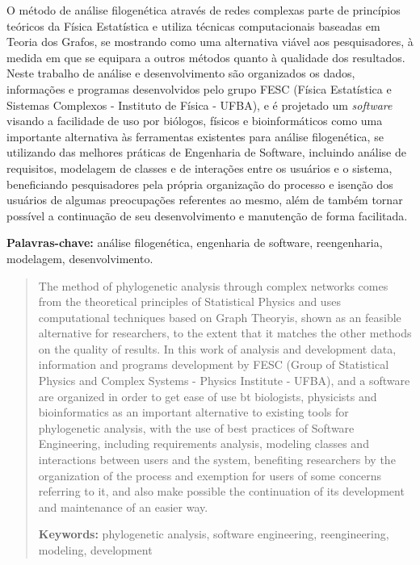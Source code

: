 \documentclass[normaltoc,capchap,capsec,times]{abnt}
\begin{document}



\begin{resumo}
O método de análise filogenética através de redes complexas parte de princípios teóricos da Física Estatística e utiliza técnicas computacionais
baseadas em Teoria dos Grafos, se mostrando como uma alternativa viável aos pesquisadores, à medida em que se equipara a outros métodos quanto à qualidade
dos resultados. Neste trabalho de análise e desenvolvimento são organizados os dados, informações e programas desenvolvidos pelo grupo FESC (Física
Estatística e Sistemas Complexos - Instituto de Física - UFBA), e é projetado um \textit{software} visando a facilidade de uso por biólogos, físicos
e bioinformáticos como uma importante alternativa às ferramentas existentes para análise filogenética, se utilizando das melhores práticas de
Engenharia de Software, incluindo análise de requisitos, modelagem de classes e de interações entre os usuários e o sistema, beneficiando pesquisadores
pela própria organização do processo e isenção dos usuários de algumas preocupações referentes ao mesmo, além de também tornar possível a continuação
de seu desenvolvimento e manutenção de forma facilitada.

\textbf{Palavras-chave:}
análise filogenética,
engenharia de software, 
reengenharia,
modelagem,
desenvolvimento.
\end{resumo}

\begin{abstract}
The method of phylogenetic analysis through complex networks comes from the theoretical principles of Statistical Physics and uses computational
techniques based on Graph Theoryis, shown as an feasible alternative for researchers, to the extent that it matches the other methods on the quality of
results. In this work of analysis and development data, information and programs development by FESC (Group of Statistical Physics and Complex Systems - 
Physics Institute - UFBA), and a software are organized in order to get ease of use bt biologists, physicists and bioinformatics as an important
alternative to existing tools for phylogenetic analysis, with the use of best practices of Software Engineering, including requirements analysis,
modeling classes and interactions between users and the system, benefiting researchers by the organization of the process and exemption
for users of some concerns referring to it, and also make possible the continuation of its development and maintenance of an easier way.

\textbf{Keywords:} 
phylogenetic analysis,
software engineering,
reengineering,
modeling,
development
\end{abstract}

\listadefiguras
\listadesiglas

\sumario







\end{document}
